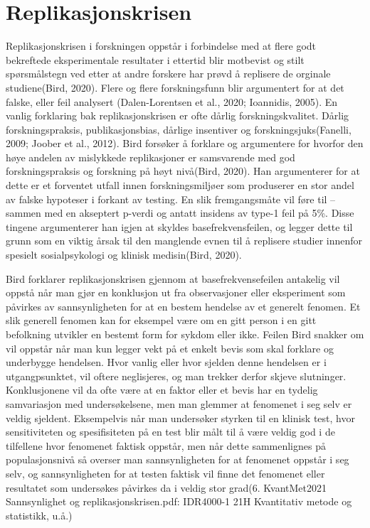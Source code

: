 \documentclass[
]{book}
\begin{document}
\hypertarget{replikasjonskrisen}{%
\section{Replikasjonskrisen}\label{replikasjonskrisen}}

Replikasjonskrisen i forskningen oppstår i forbindelse med at flere godt bekreftede eksperimentale resultater i ettertid blir motbevist og stilt spørsmålstegn ved etter at andre forskere har prøvd å replisere de orginale studiene(Bird, 2020). Flere og flere forskningsfunn blir argumentert for at det falske, eller feil analysert (Dalen-Lorentsen et al., 2020; Ioannidis, 2005). En vanlig forklaring bak replikasjonskrisen er ofte dårlig forskningskvalitet. Dårlig forskningspraksis, publikasjonsbias, dårlige insentiver og forskningsjuks(Fanelli, 2009; Joober et al., 2012). Bird forsøker å forklare og argumentere for hvorfor den høye andelen av mislykkede replikasjoner er samsvarende med god forskningspraksis og forskning på høyt nivå(Bird, 2020). Han argumenterer for at dette er et forventet utfall innen forskningsmiljøer som produserer en stor andel av falske hypoteser i forkant av testing. En slik fremgangsmåte vil føre til -- sammen med en akseptert p-verdi og antatt insidens av type-1 feil på 5\%. Disse tingene argumenterer han igjen at skyldes basefrekvensfeilen, og legger dette til grunn som en viktig årsak til den manglende evnen til å replisere studier innenfor spesielt sosialpsykologi og klinisk medisin(Bird, 2020).

Bird forklarer replikasjonskrisen gjennom at basefrekvensefeilen antakelig vil oppstå når man gjør en konklusjon ut fra observasjoner eller eksperiment som påvirkes av sannsynligheten for at en bestem hendelse av et generelt fenomen. Et slik generell fenomen kan for eksempel være om en gitt person i en gitt befolkning utvikler en bestemt form for sykdom eller ikke. Feilen Bird snakker om vil oppstår når man kun legger vekt på et enkelt bevis som skal forklare og underbygge hendelsen. Hvor vanlig eller hvor sjelden denne hendelsen er i utgangpsunktet, vil oftere neglisjeres, og man trekker derfor skjeve slutninger. Konklusjonene vil da ofte være at en faktor eller et bevis har en tydelig samvariasjon med undersøkelsene, men man glemmer at fenomenet i seg selv er veldig sjeldent. Eksempelvis når man undersøker styrken til en klinisk test, hvor sensitiviteten og spesifisiteten på en test blir målt til å være veldig god i de tilfellene hvor fenomenet faktisk oppstår, men når dette sammenlignes på populasjonsnivå så overser man sannsynligheten for at fenomenet oppstår i seg selv, og sannsynligheten for at testen faktisk vil finne det fenomenet eller resultatet som undersøkes påvirkes da i veldig stor grad(6. KvantMet2021 Sannsynlighet og replikasjonskrisen.pdf: IDR4000-1 21H Kvantitativ metode og statistikk, u.å.)
\end{document}
